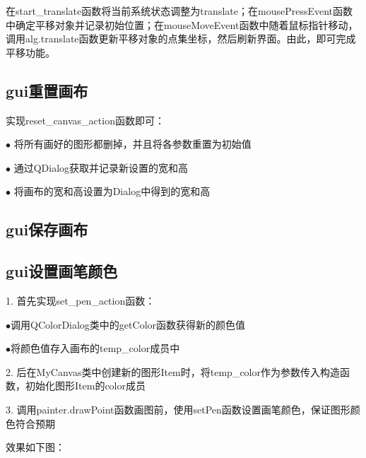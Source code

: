 \documentclass[a4paper,UTF8]{article}
\theoremstyle{definition}
\begin{document}
在start\_translate函数将当前系统状态调整为translate；在mousePressEvent函数中确定平移对象并记录初始位置；在mouseMoveEvent函数中随着鼠标指针移动，调用alg.translate函数更新平移对象的点集坐标，然后刷新界面。由此，即可完成平移功能。

\subsection{gui重置画布}

实现reset\_canvas\_action函数即可：

$\bullet$ 将所有画好的图形都删掉，并且将各参数重置为初始值

$\bullet$ 通过QDialog获取并记录新设置的宽和高

$\bullet$ 将画布的宽和高设置为Dialog中得到的宽和高

\subsection{gui保存画布}

\subsection{gui设置画笔颜色}

1. 首先实现set\_pen\_action函数：

$\bullet$调用QColorDialog类中的getColor函数获得新的颜色值

$\bullet$将颜色值存入画布的temp\_color成员中

2. 后在MyCanvas类中创建新的图形Item时，将temp\_color作为参数传入构造函数，初始化图形Item的color成员

3. 调用painter.drawPoint函数画图前，使用setPen函数设置画笔颜色，保证图形颜色符合预期

效果如下图：
\end{document}
